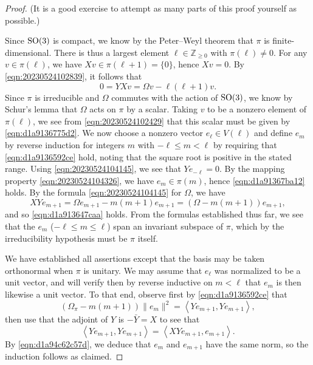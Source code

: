 \documentclass[reqno]{amsart} 
\numberwithin{equation}{section}
\begin{document}
\begin{proof}
  (It is a good exercise to attempt as many parts of this proof yourself as possible.)
  
  Since $\operatorname{SO}(3)$ is compact, we know by the Peter--Weyl theorem that $\pi$ is finite-dimensional.  There is thus a largest element $\ell \in \mathbb{Z}_{\geq 0}$ with $\pi(\ell) \neq 0$.  For any $v \in \pi(\ell)$, we have $X v \in \pi(\ell+1) = \{0\}$, hence $X v = 0$.  By \eqref{eqn:20230524102839}, it follows that
  \begin{equation}\label{eqn:20230524102429}
    0 = Y X v = \Omega v - \ell (\ell + 1) v.
  \end{equation}
  Since $\pi$ is irreducible and $\Omega$ commutes with the action of $\operatorname{SO}(3)$, we know by Schur's lemma that $\Omega$ acts on $\pi$ by a scalar.  Taking $v$ to be a nonzero element of $\pi(\ell)$, we see from \eqref{eqn:20230524102429} that this scalar must be given by \eqref{eqn:d1a9136775d2}.  We now choose a nonzero vector $e_{\ell} \in V(\ell)$ and define $e_m$ by reverse induction for integers $m$ with $- \ell \leq m < \ell$ by requiring that \eqref{eqn:d1a9136592ce} hold, noting that the square root is positive in the stated range.  Using \eqref{eqn:20230524104145}, we see that $Y e_{- \ell} = 0$.  By the mapping property \eqref{eqn:20230524104326}, we have $e_m \in \pi(m)$, hence \eqref{eqn:d1a91367ba12} holds.  By the formula \eqref{eqn:20230524104145} for $\Omega$, we have
  \begin{equation}\label{eqn:d1a94c62c57d}
    X Y e_{m + 1} = \Omega e_{m+1} - m(m+1) e_{m+1}
    =
    (\Omega - m (m + 1)) e_{m+1},
  \end{equation}
  and so \eqref{eqn:d1a913647caa} holds.  From the formulas established thus far, we see that the $e_m$ ($- \ell \leq m \leq \ell$) span an invariant subspace of $\pi$, which by the irreducibility hypothesis must be $\pi$ itself.

  We have established all assertions except that the basis may be taken orthonormal when $\pi$ is unitary.  We may assume that $e_{\ell}$ was normalized to be a unit vector, and will verify then by reverse inductive on $m < \ell$ that $e_m$ is then likewise a unit vector.  To that end, observe first by \eqref{eqn:d1a9136592ce} that
  \begin{equation*}
    (\Omega_\pi - m(m+1))
    \lVert e_{m} \rVert^2
    = \left\langle Y e_{m + 1}, Y e_{m+1} \right\rangle,
  \end{equation*}
  then use that the adjoint of $Y$ is $- \bar{Y} = X$ to see that
  \begin{equation*}
    \left\langle Y e_{m + 1}, Y e_{m+1} \right\rangle
    =
    \left\langle X Y e_{m + 1}, e_{m+1} \right\rangle.
  \end{equation*}
  By \eqref{eqn:d1a94c62c57d}, we deduce that $e_m$ and $e_{m + 1}$ have the same norm, so the induction follows as claimed.
\end{proof}
\end{document}
